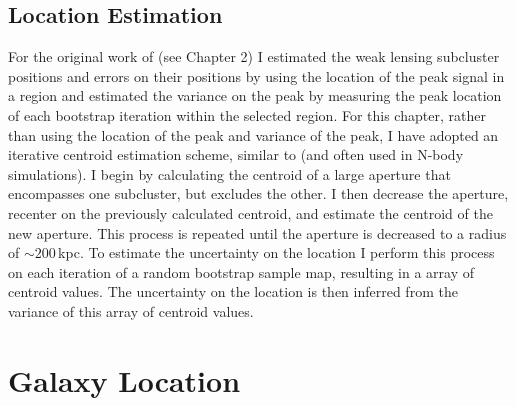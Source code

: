 \subsection{Location Estimation}
For the original work of \citet{Dawson:2012dl} (see Chapter 2) I estimated the weak lensing subcluster positions and errors on their positions by using the location of the peak signal in a region and estimated the variance on the peak by measuring the peak location of each bootstrap iteration within the selected region.  
For this chapter, rather than using the location of the peak and variance of the peak, I have adopted an iterative centroid estimation scheme, similar to \citet{Randall:2008hs} (and often used in N-body simulations). 
I begin by calculating the centroid of a large aperture that encompasses one subcluster, but excludes the other.
I then decrease the aperture, recenter on the previously calculated centroid, and estimate the centroid of the new aperture.
This process is repeated until the aperture is decreased to a radius of $\sim200$\,kpc.
To estimate the uncertainty on the location I perform this process on each iteration of a random bootstrap sample map, resulting in a array of centroid values.
 The uncertainty on the location is then inferred from the variance of this array of centroid values.


\section{Galaxy Location}\label{section:GalaxyLocation}


